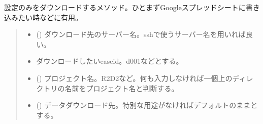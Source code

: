 \documentclass[letterpaper,10pt,dvipdfmx,report]{sphinxmanual}
\begin{document}
\begin{fulllineitems}
\label{\detokenize{io:R2D2.R2D2.sync.set}}
\pysigstartsignatures
{}
\pysigstopsignatures
\sphinxAtStartPar
設定のみをダウンロードするメソッド。ひとまずGoogleスプレッドシートに書き込みたい時などに有用。
\begin{quote}\begin{description}
\begin{itemize}
\item {} 
\sphinxAtStartPar
{} () \sphinxhyphen{}\sphinxhyphen{} ダウンロード先のサーバー名。sshで使うサーバー名を用いれば良い。

\item {} 
\sphinxAtStartPar
{} \sphinxhyphen{}\sphinxhyphen{} ダウンロードしたいcaseid。\textquotesingle{}d001\textquotesingle{}などとする。

\item {} 
\sphinxAtStartPar
{} () \sphinxhyphen{}\sphinxhyphen{} プロジェクト名。\textquotesingle{}R2D2\textquotesingle{}など。何も入力しなければ一個上のディレクトリの名前をプロジェクト名と判断する。

\item {} 
\sphinxAtStartPar
{} () \sphinxhyphen{}\sphinxhyphen{} データダウンロード先。特別な用途がなければデフォルトのままとする。

\end{itemize}

\end{description}\end{quote}

\end{fulllineitems}

\end{document}
